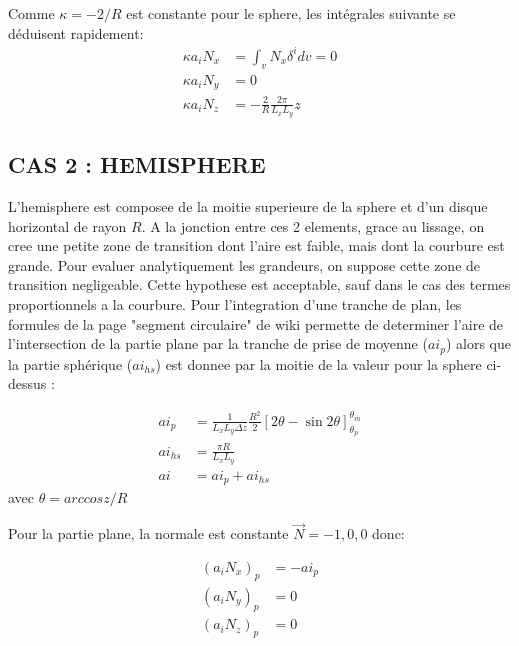 Comme $\kappa = -2/R$ est constante pour le sphere, les int\'egrales suivante se d\'eduisent rapidement:
\begin{subequations}
\begin{align}
  \kappa a_iN_x &= \int_v N_x \delta^i dv = 0  \\
  \kappa a_iN_y &= 0  \\
  \kappa a_iN_z &= -\frac{2}{R} \frac{2\pi}{L_xL_y} z
\end{align}
\end{subequations}

\subsection{CAS 2 : HEMISPHERE }

L'hemisphere est composee de la moitie superieure de la sphere et d'un disque horizontal de rayon $R$. 
A la jonction entre ces 2 elements, grace au lissage, on cree une petite zone de transition dont l'aire est
faible, mais dont la courbure est grande. Pour evaluer analytiquement les grandeurs, on suppose cette zone de
transition negligeable. Cette hypothese est acceptable, sauf dans le cas des termes proportionnels a la 
courbure. Pour l'integration d'une tranche de plan, les formules de la page "segment circulaire" de wiki 
permette de determiner l'aire de l'intersection de la partie plane par la tranche de prise de moyenne ($ai_p$)
alors que la partie sph\'erique ($ai_{hs}$) est donnee par la moitie de la valeur pour la sphere ci-dessus :

\begin{subequations}
\begin{align}
ai_p &= \frac{1}{L_xL_y \Delta z} \frac{R^2}{2} \left[2\theta - \sin 2\theta \right]_{\theta_p}^{\theta_m} \\
ai_{hs} &= \frac{\pi R}{L_x L_y} \\
ai  &= ai_p+ai_{hs}
\end{align}
\end{subequations}
avec $\theta=arccos{z/R}$

Pour la partie plane, la normale est constante $\vec{N} = {-1,0,0}$ donc:

\begin{subequations}
\begin{align}
  (a_iN_x)_p &= -ai_p \\
  (a_iN_y)_p &= 0 \\
  (a_iN_z)_p &= 0
\end{align}
\end{subequations}
 

